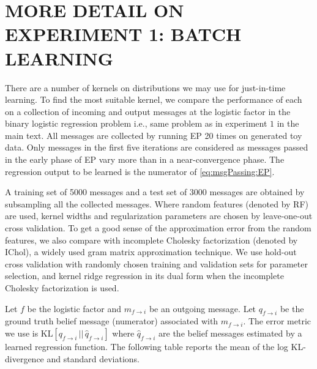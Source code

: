 \documentclass[english]{article}
\theoremstyle{plain}
\theoremstyle{plain}
\newcommand{\factor}{f}				%
\begin{document}
\section{MORE DETAIL ON EXPERIMENT 1: BATCH LEARNING }
\label{sec:batch_learning_detail}

There are a number of kernels on distributions we may use for just-in-time learning.
To find the most suitable kernel, we compare the performance of each on a 
collection of incoming and output
messages at the logistic factor in the binary logistic regression problem i.e., 
same problem as in experiment $1$ in the main text.
All messages are collected by running EP 20 times on generated toy data. 
Only messages in the first five iterations are considered as messages passed in 
the early phase of EP vary more than in a near-convergence phase.
The regression output to be learned is the numerator of \eqref{eq:msgPassing:EP}. 

A training set of 5000 messages and a test set of 3000 messages are obtained by 
subsampling all the collected messages. 
Where random features (denoted by RF) are used, kernel widths 
and regularization parameters are chosen by leave-one-out cross validation.
To get a good sense of the approximation error from the random features, we also 
compare with incomplete Cholesky factorization (denoted by IChol), a widely used 
gram matrix approximation technique. We use
hold-out cross validation with randomly chosen training and validation sets
for parameter selection,
and kernel ridge regression in its dual form when the incomplete Cholesky 
factorization is used. 

Let $\factor$ be the logistic factor and $m_{\factor \rightarrow i}$ be an outgoing message. 
Let $q_{\factor \rightarrow i}$ be the ground truth belief message (numerator) associated with 
$m_{\factor\rightarrow i}$. The error metric we use is 
$\mathrm{KL}[q_{\factor \rightarrow i}\,||\, \hat{q}_{\factor \rightarrow i}]$
where  $\hat{q}_{\factor \rightarrow i}$ are the belief messages estimated by a learned 
regression function. The following table reports the mean of the log KL-divergence 
and standard deviations.
\end{document}

